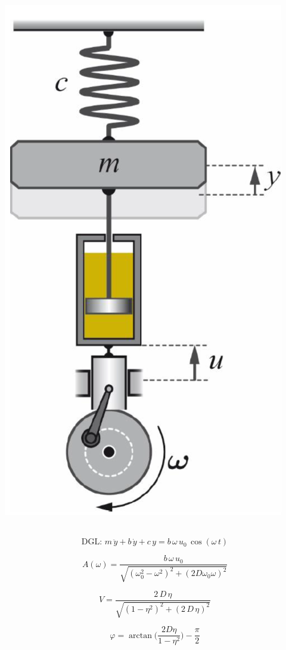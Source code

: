 \begin{minipage}{0.25\linewidth}
\includegraphics[width=0.9\linewidth]{Bilder/Wellen-Optik/daempfererregung} \\
\\
\end{minipage}
\hfill
\begin{minipage}{0.72\linewidth}
$$ \boxed{ \text{DGL: } m \, \ddot{y} + b \, \dot{y} + c \, y = b \, \omega  \, u_0 \, \cos(\omega \, t)  } $$  

$$ A(\omega) =  \frac{b \, \omega \, u_0}{\sqrt{(\omega_0^2 -\omega^2)^2 + (2D \omega_0 \omega)^2}} $$ 

$$ \boxed{ V = \frac{2 \, D \, \eta}{\sqrt{(1- \eta^2)^2 + (2 \, D \, \eta)^2} } } $$

$$ \boxed{ \varphi = \arctan \Big( \frac{2 D \eta}{1 - \eta^2} \Big) - \frac{\pi}{2} } $$ 


\end{minipage}


